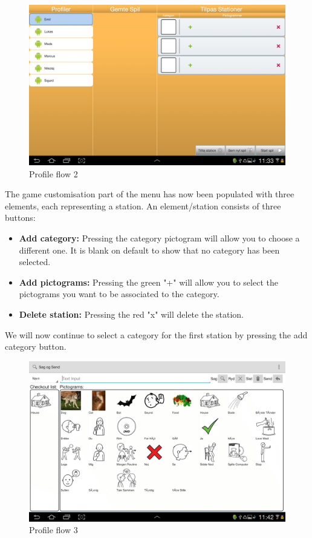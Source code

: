 \begin{figure}[H]
\centering
\includegraphics[width=0.9\linewidth]{img/screenshots/profile_flow_2.jpg}%
\caption{Profile flow 2}
\label{fig:profile_flow_2}
\end{figure}

The game customisation part of the menu has now been populated with three elements, each representing a station. An element/station consists of three buttons:
\begin{itemize}
\item \textbf{Add category:} Pressing the category pictogram will allow you to choose a different one. It is blank on default to show that no category has been selected.
\item \textbf{Add pictograms:} Pressing the green "+" will allow you to select the pictograms you want to be associated to the category.
\item \textbf{Delete station:} Pressing the red "x" will delete the station.
\end{itemize}
We will now continue to select a category for the first station by pressing the add category button.

\begin{figure}[H]
\centering
\includegraphics[width=0.9\linewidth]{img/screenshots/profile_flow_3.jpg}%
\caption{Profile flow 3}
\label{fig:profile_flow_3}
\end{figure}

